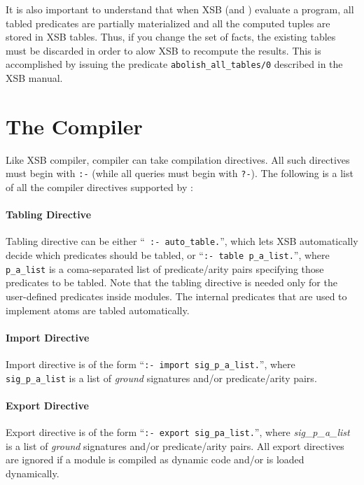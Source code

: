 \documentclass[11pt]{report}
\begin{document}
It is also important to understand that when XSB (and \FLORA) evaluate a
program, all tabled predicates are partially materialized and all the
computed tuples are stored in XSB tables. Thus, if you change the set of
facts, the existing tables must be discarded in order to alow XSB to
recompute the results. This is accomplished by issuing the predicate
{\tt abolish\_all\_tables/0} described in the XSB manual.


\section{The \FLORA Compiler} \label{sec-comp-directives}

Like XSB compiler, \FLORA compiler can take compilation directives. All
such directives must begin with {\tt :-} (while all queries must begin with
{\tt ?-}). The following is a list of all the compiler directives supported
by \FLORA:

\paragraph{Tabling Directive} Tabling directive can be either ``{\tt
  :- auto\_table.}'', which lets XSB automatically decide which predicates
should be tabled, or ``{\tt :- table p\_a\_list.}'', where {\tt p\_a\_list}
is a coma-separated list of \mbox{predicate/arity} pairs specifying those
predicates to be tabled. Note that the tabling directive is needed only for
the user-defined predicates inside \FLORA modules. The internal \FLORA
predicates that are used to implement \fl atoms are tabled automatically.

\paragraph{Import Directive} Import directive is of the form
``{\tt :- import sig\_p\_a\_list.}'', where {\tt sig\_p\_a\_list} is a
list of \emph{ground} \fl signatures \mbox{and/or} \mbox{predicate/arity}
pairs.

\paragraph{Export Directive} Export directive is of the form
``{\tt :- export sig\_pa\_list.}'', where \emph{sig\_p\_a\_list} is a list of
\emph{ground} \fl signatures \mbox{and/or} \mbox{predicate/arity} pairs.
All export directives are ignored if a \FLORA module is compiled as dynamic
code and/or is loaded dynamically.
\end{document}
